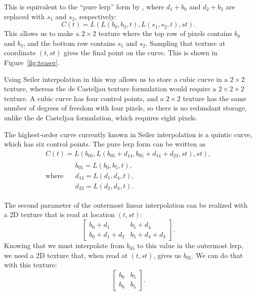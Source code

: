 \documentclass{jcgt}
\begin{document}
This is equivalent to the ``pure lerp'' form by \citet{10.1145/3641233.3664331}, where $d_1 + b_0$ and $d_2 + b_3$ are replaced with $s_1$ and $s_2$, respectively:
\begin{equation}
C(t) = L( L(b_0, b_3, t), L(s_1, s_2, t), st).
\end{equation}
This allows us to make a $2 \times 2$ texture where the top row of pixels contains $b_0$ and $b_3$, and the bottom row contains $s_1$ and $s_2$. Sampling that texture at coordinate $(t, st)$ gives the final point on the curve. This is shown in Figure~\ref{fig:teaser}.

Using Seiler interpolation in this way allows us to store a cubic curve in a $2 \times 2$ texture, whereas the de Casteljau texture formulation would require a $2 \times 2 \times 2$ texture. A cubic curve has four control points, and a $2 \times 2$ texture has the same number of degrees of freedom with four pixels, so
there is no redundant storage, unlike the de Casteljau formulation, which requires eight pixels.

The highest-order curve currently known in Seiler interpolation is a quintic curve, which has six control points. The pure lerp form can be written as
\begin{equation}
    \begin{split}
    C(t) = L(b_{05}, L(b_{05} + d_{14}, b_{05} + d_{14} + d_{23}, st), st), \\
    \text{where } \quad
    \begin{array}{l}
    b_{05} = L(b_0, b_5, t), \\
    d_{14} = L(d_1, d_4, t), \\
    d_{23} = L(d_2, d_3, t).
    \end{array}
    \end{split}
\end{equation}

The second parameter of the outermost linear interpolation can be realized with a 2D texture that is read at location $(t, st)$:
\[
\begin{bmatrix}
b_0 + d_1 & b_5 + d_4 \\
b_0 + d_1 + d_2 & b_5 + d_4 + d_3
\end{bmatrix} .
\]
Knowing that we must interpolate from $b_{05}$ to this value in the outermost lerp, we need a 2D texture that, when read at $(t, st)$, gives us $b_{05}$. We can do that with this texture:
\[
\begin{bmatrix}
b_0 & b_5\\
b_0 & b_5 
\end{bmatrix} .
\]
\end{document}
